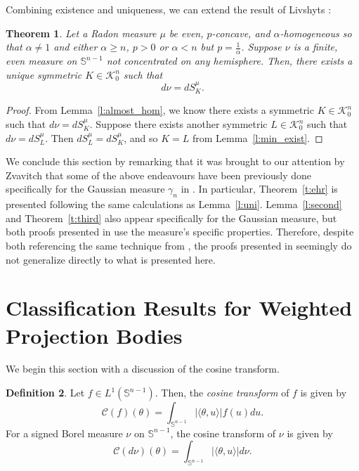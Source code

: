 \documentclass[11pt]{amsart}
\newtheorem{theorem}{Theorem}[section]
\theoremstyle{definition}
\newtheorem{definition}[theorem]{Definition}
\theoremstyle{remark}
\numberwithin{equation}{section}
\newcommand{\s}{\mathbb{S}}
\newcommand{\conbod}{\mathcal{K}^n}
\newcommand{\ct}[2]{\mathcal{C}({#1})({#2})}
\begin{document}
Combining existence and uniqueness, we can extend the result of Livshyts \cite{GAL19}:

\begin{theorem}
\label{t:min_exist_uni}
Let a Radon measure $\mu$ be even, $p$-concave, and $\alpha$-homogeneous so that $\alpha \neq 1$ and either $\alpha \geq n$, $p>0$ or $\alpha<n$ but $p=\frac{1}{\alpha}$.  Suppose $\nu$ is a finite, even measure on $\s^{n-1}$ not concentrated on any hemisphere. Then, there exists a unique symmetric $K\in\conbod_0$ such that
$$d\nu=dS^{\mu}_{K}.$$
\end{theorem}
\begin{proof}
From Lemma~\ref{l:almost_hom}, we know there exists a symmetric $K\in\conbod_0$ such that $d\nu=dS^{\mu}_{K}$. Suppose there exists another symmetric $L \in\conbod_0$ such that $d\nu=dS^{\mu}_{L}$. Then $dS^{\mu}_{L}=dS^{\mu}_{K}$, and so $K=L$ from Lemma~\ref{l:min_exist}.
\end{proof}

We conclude this section by remarking that it was brought to our attention by Zvavitch that some of the above endeavours have been previously done specifically for the Gaussian measure $\gamma_n$ in \cite{HXZ21}. In particular, Theorem~\ref{t:ehr} is presented following the same calculations as Lemma~\ref{l:uni}. Lemma~\ref{l:second} and Theorem~\ref{t:third} also appear specifically for the Gaussian measure, but both proofs presented in \cite{HXZ21} use the measure's specific properties. Therefore, despite both referencing the same technique from \cite{HLYZ10}, the proofs presented in \cite{HXZ21} seemingly do not generalize directly to what is presented here.

\section{Classification Results for Weighted Projection Bodies}
\label{s:class}
We begin this section with a discussion of the cosine transform.
\begin{definition}
\label{def:cos}
Let $f\in L^1(\s^{n-1})$. Then, the \textit{cosine transform} of $f$ is given by
$$\ct{f}{\theta}=\int_{\s^{n-1}}|\langle\theta,u\rangle|f(u)du.$$
For a signed Borel measure $\nu$ on $\s^{n-1}$, the cosine transform of $\nu$ is given by
$$\ct{d\nu}{\theta}=\int_{\s^{n-1}}|\langle\theta,u\rangle|d\nu.$$
\end{definition}
\end{document}
